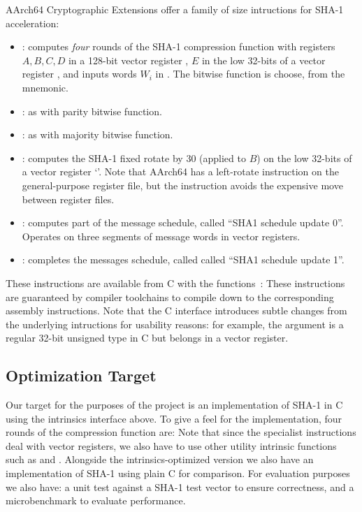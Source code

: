 AArch64 Cryptographic Extensions offer a family of size intructions for SHA-1
acceleration:
%
\begin{itemize}
    \item {}:
        computes \emph{four} rounds of the SHA-1 compression function with
        registers $A,B,C,D$ in a 128-bit vector register , $E$ in the
        low 32-bits of a vector register , and inputs words $W_i$ in
        . The bitwise function is choose, from the  mnemonic.
    \item {}:
        as  with parity bitwise function.
    \item {}:
        as  with majority bitwise function.
    \item {}:
        computes the SHA-1 fixed rotate by 30 (applied to $B$) on the low
        32-bits of a vector register `'. Note that AArch64 has a
        left-rotate instruction on the general-purpose register file, but the
         instruction avoids the expensive move between register
        files.
    \item {}:
        computes part of the message schedule, called ``SHA1 schedule update
        0''. Operates on three segments of message words in vector registers.
    \item {}:
        completes the messages schedule, called called ``SHA1 schedule update
        1''.
\end{itemize}

These instructions are available from C with the 
functions~\cite{arm-neon-sha}:
%
%
These instructions are guaranteed by compiler toolchains to compile down to the
corresponding assembly instructions.  Note that the C interface introduces
subtle changes from the underlying intructions for usability reasons: for
example, the  argument is a regular 32-bit unsigned type in C but
belongs in a vector register.

\subsection{Optimization Target}

Our target for the purposes of the project is an implementation of SHA-1 in C
using the intrinsics interface above. To give a feel for the implementation,
four rounds of the compression function are:
%
%
Note that since the specialist instructions deal with vector registers, we also
have to use other utility intrinsic functions such as 
and .
%
Alongside the intrinsics-optimized version we also have an implementation of
SHA-1 using plain C for comparison.
%
For evaluation purposes we also have: a unit test against a SHA-1 test
vector to ensure correctness, and a microbenchmark to evaluate performance.

